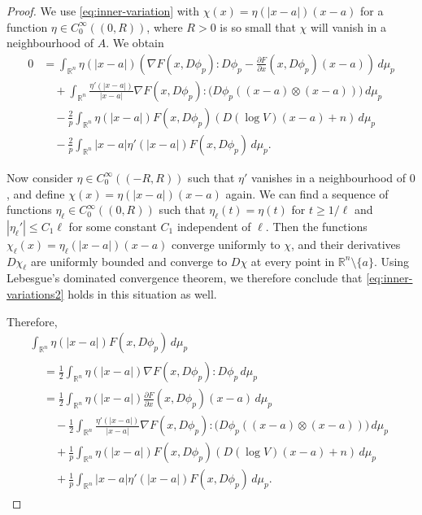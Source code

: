 \documentclass[a4paper]{article}
\newcommand{\R}{\mathbb{R}}
\newcommand{\grad}{\nabla}
\newcommand{\dd}[2]{\frac{\partial #1}{\partial #2}}
\theoremstyle{definition}
\theoremstyle{remark}
\begin{document}
\begin{proof}
We use \eqref{eq:inner-variation} with $\chi(x) = \eta(|x - a|) (x - a)$
for a function $\eta \in C_0^\infty((0, R))$, where $R > 0$ is so small
that $\chi$ will vanish in a neighbourhood of $A$. We obtain
\begin{equation} \label{eq:inner-variations2}
\begin{split}
0 & = \int_{\R^n} \eta(|x - a|) \left(\grad F(x, D\phi_p) : D\phi_p - \dd{F}{x}(x, D\phi_p) (x - a)\right) \, d\mu_p \\
& \quad + \int_{\R^n} \frac{\eta'(|x - a|)}{|x - a|} \grad F(x, D\phi_p) : \bigl(D\phi_p ((x - a) \otimes (x - a))\bigr) \, d\mu_p \\
& \quad - \frac{2}{p} \int_{\R^n} \eta(|x - a|) F(x, D\phi_p) \left(D(\log V) (x - a) + n\right) \, d\mu_p \\
& \quad - \frac{2}{p} \int_{\R^n} |x - a| \eta'(|x - a|) F(x, D\phi_p) \, d\mu_p.
\end{split}
\end{equation}

Now consider $\eta \in C_0^\infty((-R, R))$ such that $\eta'$ vanishes in
a neighbourhood of $0$, and define
$\chi(x) = \eta(|x - a|)(x - a)$ again. We can find a sequence of functions
$\eta_\ell \in C_0^\infty((0, R))$ such that $\eta_\ell(t) = \eta(t)$ for
$t \ge 1/\ell$ and $|\eta_\ell'| \le C_1\ell$ for some constant $C_1$ independent of $\ell$. Then the functions
$\chi_\ell(x) = \eta_\ell(|x - a|) (x - a)$ converge uniformly to $\chi$,
and their derivatives $D\chi_\ell$ are uniformly bounded and converge to
$D\chi$ at every point in $\R^n \setminus \{a\}$. Using Lebesgue's
dominated convergence theorem, we therefore conclude that
\eqref{eq:inner-variations2} holds in this situation as well.

Therefore,
\begin{multline*}
\int_{\R^n} \eta(|x - a|) F(x, D\phi_p) \, d\mu_p \\
\begin{aligned}
& = \frac{1}{2} \int_{\R^n} \eta(|x - a|) \grad F(x, D\phi_p) : D\phi_p \, d\mu_p \\
& = \frac{1}{2} \int_{\R^n} \eta(|x - a|) \dd{F}{x}(x, D\phi_p) (x - a) \, d\mu_p \\
& \quad - \frac{1}{2} \int_{\R^n} \frac{\eta'(|x - a|)}{|x - a|} \grad F(x, D\phi_p) : \bigl(D\phi_p ((x - a) \otimes (x - a))\bigr) \, d\mu_p \\
& \quad + \frac{1}{p} \int_{\R^n} \eta(|x - a|) F(x, D\phi_p) \left(D(\log V) (x - a) + n\right) \, d\mu_p \\
& \quad + \frac{1}{p} \int_{\R^n} |x - a| \eta'(|x - a|) F(x, D\phi_p) \, d\mu_p.
\end{aligned}
\end{multline*}


\end{proof}
\end{document}
